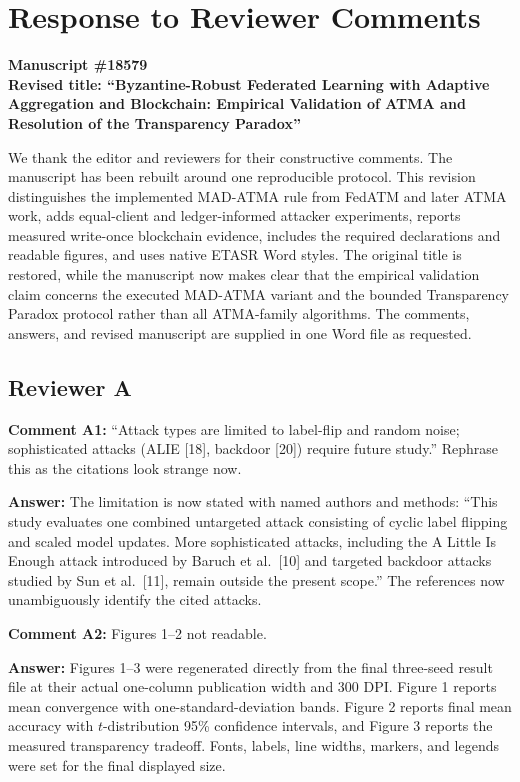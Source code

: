 \documentclass[10pt,letterpaper]{article}
\begin{document}
\section*{Response to Reviewer Comments}
\small
\textbf{Manuscript \#18579}\\
\textbf{Revised title: ``Byzantine-Robust Federated Learning with Adaptive
Aggregation and Blockchain: Empirical Validation of ATMA and Resolution of the
Transparency Paradox''}

We thank the editor and reviewers for their constructive comments. The manuscript
has been rebuilt around one reproducible protocol. This revision distinguishes
the implemented MAD-ATMA rule from FedATM and later ATMA work, adds equal-client
and ledger-informed attacker experiments, reports measured write-once blockchain
evidence, includes the required declarations and readable figures, and uses
native ETASR Word styles. The original title is restored, while the manuscript
now makes clear that the empirical validation claim concerns the executed
MAD-ATMA variant and the bounded Transparency Paradox protocol rather than all
ATMA-family algorithms. The comments, answers, and revised manuscript are
supplied in one Word file as requested.

\subsection*{Reviewer A}
\textbf{Comment A1:} ``Attack types are limited to label-flip and random noise;
sophisticated attacks (ALIE [18], backdoor [20]) require future study.'' Rephrase
this as the citations look strange now.

\textbf{Answer:} The limitation is now stated with named authors and methods:
``This study evaluates one combined untargeted attack consisting of cyclic label
flipping and scaled model updates. More sophisticated attacks, including the A
Little Is Enough attack introduced by Baruch et al.~[10] and targeted backdoor
attacks studied by Sun et al.~[11], remain outside the present scope.'' The
references now unambiguously identify the cited attacks.

\textbf{Comment A2:} Figures 1--2 not readable.

\textbf{Answer:} Figures 1--3 were regenerated directly from the final
three-seed result file at their actual one-column publication width and 300 DPI.
Figure 1 reports mean convergence with one-standard-deviation bands. Figure 2
reports final mean accuracy with $t$-distribution 95\% confidence intervals,
and Figure 3 reports the measured transparency tradeoff. Fonts, labels, line
widths, markers, and legends were set for the final displayed size.
\end{document}

